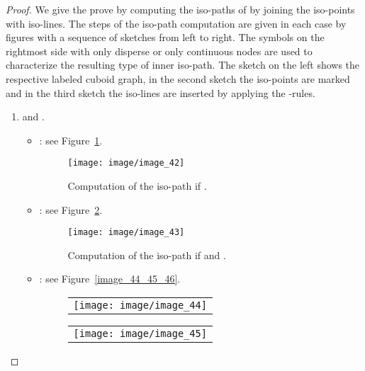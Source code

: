 \documentclass[a4paper,11pt]{article}
\begin{document}
\begin{proof} We give the prove by computing the iso-paths of  by joining the iso-points with iso-lines.
The steps of the iso-path computation are given in each case by figures with a sequence of sketches from
left to right. The symbols on the rightmost side with only disperse or only continuous nodes are used
to characterize the resulting type of inner iso-path. The sketch on the left shows the respective
labeled cuboid graph, in the second sketch the iso-points are marked and in the third sketch the iso-lines
are inserted by applying the -rules.
\begin{enumerate}
\item  and .
\begin{itemize}
\item[] : see Figure~\ref{image_42}.
\begin{figure}[!ht]
\texttt{[image: image/image\_42]}
\caption{Computation of the iso-path if .}
\label{image_42}
\end{figure}
\FloatBarrier
\item[] : see Figure~\ref{image_43}.
\begin{figure}[!ht]
\texttt{[image: image/image\_43]}
\caption{Computation of the iso-path if  and .}
\label{image_43}
\end{figure}
\FloatBarrier
\item[] : see Figure~\ref{image_44_45_46}.
\begin{figure}[!ht]

\begin{tabular}[c]{l}
\texttt{[image: image/image\_44]}
\end{tabular}

\vspace{0.2cm}

\begin{tabular}[c]{l}
\texttt{[image: image/image\_45]}
\end{tabular}

\vspace{0.2cm}


\end{figure}
\end{itemize}
\end{enumerate}
\end{proof}
\end{document}
